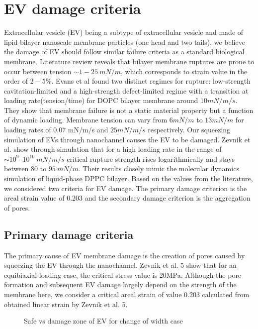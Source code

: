 \chapter{EV damage criteria}\label{appendix:C}

Extracellular vesicle (EV) being a subtype of extracellular vesicle and made of lipid-bilayer nanoscale membrane particles (one head and two tails), we believe the damage of EV should follow similar failure criteria as a standard biological membrane. Literature review \cite{s1,s2,s3} reveals that bilayer membrane ruptures are prone to occur between tension $\sim1-25 \ mN/m$, which corresponds to strain value in the order of $2 -5\%$. Evans et al\cite{s4} found two distinct regimes for rupture: low-strength cavitation-limited and a high-strength defect-limited regime with a transition at loading rate(tension/time) for DOPC bilayer membrane around $10 mN/m/s$. They show that membrane failure is not a static material property but a function of dynamic loading. Membrane tension can vary from $6 mN/m$ to $13 mN/m$ for loading rates of 0.07 mN/m/s and $25 mN/m/s$ respectively. Our squeezing simulation of EVs through nanochannel causes the EV to be damaged. Zevnik \cite{s5} et al. show through simulation that for a high loading rate in the range of $\sim 10^9 – 10^{10} \ mN/m/s$ critical rupture strength rises logarithmically and stays between 80 to $95 \  mN/m$. Their results closely mimic the molecular dynamics simulation of liquid-phase DPPC bilayer\cite{s6}. Based on the values from the literature, we considered two criteria for EV damage. The primary damage criterion is the areal strain value of 0.203 and the secondary damage criterion is the aggregation of pores.

\section{Primary damage criteria}

The primary cause of EV membrane damage is the creation of pores caused by squeezing the EV through the nanochannel. Zevnik et al. 5 show that for an equibiaxial loading case, the critical stress value is 20MPa. Although the pore formation and subsequent EV damage largely depend on the strength of the membrane here, we consider a critical areal strain of value 0.203 calculated from obtained linear strain by Zevnik et al. 5.

\begin{figure}[htbp]
  \centering
  
  \vspace{0.5cm}
  \caption{Safe vs damage zone of EV for change of width case}
  \label{A:3}
\end{figure}

